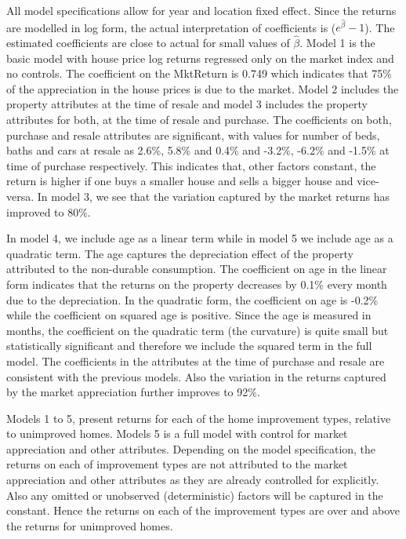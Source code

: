 \documentclass{article}
\begin{document}
All model specifications allow for year and location fixed effect. Since the returns are modelled in log form, the actual interpretation of coefficients is ($e^{\hat{\beta}}-1$). The estimated coefficients are close to actual for small values of $\hat{\beta}$.  Model 1 is the basic model with house price log returns regressed only on the market index and no controls. The coefficient on the MktReturn is 0.749 which indicates that 75\% of the appreciation in the house prices is due to the market. Model 2 includes the property attributes at the time of resale and model 3 includes the property attributes for both, at the time of resale and purchase. The coefficients on both, purchase and resale attributes are significant, with values for number of beds, baths and cars at resale as 2.6\%, 5.8\% and 0.4\% and -3.2\%, -6.2\% and -1.5\% at time of purchase respectively. This indicates that, other factors constant, the return is higher if one buys a smaller house and sells a bigger house and vice-versa. In model 3, we see that the variation captured by the market returns has improved to 80\%. 

In model 4, we include age as a linear term while in model 5 we include age as a quadratic term. The age captures the depreciation effect of the property attributed to the non-durable consumption. The coefficient on age in the linear form indicates that the returns on the property decreases by 0.1\% every month due to the depreciation. In the quadratic form, the coefficient on age is -0.2\% while the coefficient on squared age is positive. Since the age is measured in months, the coefficient on the quadratic term (the curvature) is quite small but statistically significant and therefore we include the squared term in the full model. The coefficients in the attributes at the time of purchase and resale are consistent with the previous models. Also the variation in the returns captured by the market appreciation further improves to 92\%. 

Models 1 to 5, present returns for each of the home improvement types, relative to unimproved homes. Models 5 is a full model with control for market appreciation and other attributes. Depending on the model specification, the returns on each of improvement types are not attributed to the market appreciation and other attributes as they are already controlled for explicitly. Also any omitted or unobserved (deterministic) factors will be captured in the constant. Hence the returns on each of the improvement types are over and above the returns for unimproved homes. 
\end{document}
